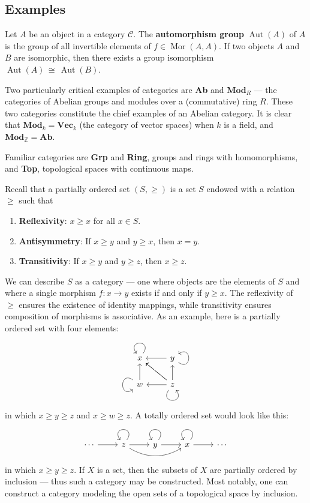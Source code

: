 \documentclass[11pt]{article}
\newcommand{\Mor}{\operatorname{Mor}}
\newcommand{\Aut}{\operatorname{Aut}}
\newcommand{\C}{\mathscr{C}}
\begin{document}

\subsection{Examples}

Let $A$ be an object in a category $\C$. The \textbf{automorphism group} $\Aut(A)$ of $A$ is the group of all invertible elements of $f \in \Mor(A, A)$. If two objects $A$ and $B$ are isomorphic, then there exists a group isomorphism $\Aut(A) \, \cong \, \Aut(B)$.

Two particularly critical examples of categories are \textbf{Ab} and $\mathbf{Mod}_{R}$ --- the categories of Abelian groups and modules over a (commutative) ring $R$. These two categories constitute the chief examples of an Abelian category. It is clear that $\mathbf{Mod}_{k} = \mathbf{Vec}_{k}$ (the category of vector spaces) when $k$ is a field, and $\mathbf{Mod}_{\mathbb{Z}} = \mathbf{Ab}$.

Familiar categories are \textbf{Grp} and \textbf{Ring}, groups and rings with homomorphisms, and \textbf{Top}, topological spaces with continuous maps.

\newpage

Recall that a partially ordered set $(S, \ge)$ is a set $S$ endowed with a relation $\ge$ such that
\begin{enumerate}
  \item \textbf{Reflexivity}: $x \ge x$ for all $x \in S$.
  \item \textbf{Antisymmetry}: If $x \ge y$ and $y \ge x$, then $x = y$.
  \item \textbf{Transitivity}: If $x \ge y$ and $y \ge z$, then $x \ge z$.
\end{enumerate}
We can describe $S$ as a category --- one where objects are the elements of $S$ and where a single morphism $f : x \to y$ exists if and only if $y \ge x$. The reflexivity of $\ge$ ensures the existence of identity mappings, while transitivity ensures composition of morphisms is associative. As an example, here is a partially ordered set with four elements:
\[ \begin{tikzcd}
  x \arrow[loop, distance=2em, in=125, out=55]            & y \arrow[l] \arrow[loop, distance=2em, in=35, out=325]                                  \\
  w \arrow[u] \arrow[loop, distance=2em, in=215, out=145] & z \arrow[l] \arrow[lu] \arrow[lu] \arrow[u] \arrow[loop, distance=2em, in=305, out=235]
\end{tikzcd} \]
in which $x \ge y \ge z$ and $x \ge w \ge z$. A totally ordered set would look like this:
\[ \begin{tikzcd}
  \cdots \arrow[r] & z \arrow[r] \arrow[loop, distance=2em, in=125, out=55] \arrow[rr, bend right] & y \arrow[r] \arrow[loop, distance=2em, in=125, out=55] & x \arrow[r] \arrow[loop, distance=2em, in=125, out=55] & \cdots
\end{tikzcd} \]
in which $x \ge y \ge z$. If $X$ is a set, then the subsets of $X$ are partially ordered by inclusion --- thus such a category may be constructed. Most notably, one can construct a category modeling the open sets of a topological space by inclusion.
\end{document}
